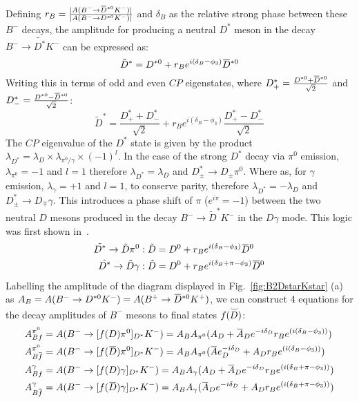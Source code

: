 \documentclass[oneside,12pt]{article}
\newcommand{\overbar}[1]{\mkern 1.5mu\overline{\mkern-1.5mu#1\mkern-1.5mu}\mkern
1.5mu}
\newcommand\brobor{\smash[b]{\raisebox{0.6\height}{\scalebox{0.5}{\tiny(}}{\mkern-1.5mu\scriptstyle-\mkern-1.5mu}\raisebox{0.6\height}{\scalebox{0.5}{\tiny)}}}}
\begin{document}
\noindent Defining $r_B=\frac{|A(B^{-}\rightarrow
\overbar{D}^{*0}K^-)|}{|A(B^{-}\rightarrow {D}^{*0}K^-)|}$ and $\delta_{B}$ as 
the relative strong phase between these $B^-$ decays, the amplitude for
producing a neutral ${D}^*$ meson in the decay $B^-\rightarrow \tilde{D^*}K^-$
can be expressed as:
  \begin{equation}
    \tilde{D}^*=D^{*0}+r_Be^{i(\delta_B-\phi_3)}\overbar{D}^{*0}
    \label{eq:DstTilde}
  \end{equation}
\noindent Writing this in terms of odd and even $CP$ eigenstates, where
$D^{*}_{+}=\frac{D^{*0}+\overbar{D}^{*0}}{\sqrt{2}}$ and
$D^{*}_{-}=\frac{D^{*0}-\overbar{D}^{*0}}{\sqrt{2}}$:
  \begin{equation}
    \tilde{D}^*=\frac{D^{*}_{+}+D^{*}_{-}}{\sqrt{2}}+r_Be^{i(\delta_B-\phi_3)}\frac{D^{*}_{+}-D^{*}_{-}}{\sqrt{2}}
    \label{eq:DstTildeCP}
  \end{equation}
\noindent The $CP$ eigenvalue of the $D^*$ state is given by the product
$\lambda_{D^*}=\lambda_D\times \lambda_{\pi^0\text{/}\gamma} \times(-1)^l$. In
the case of the strong $D^*$ decay via $\pi^0$ emission, $\lambda_{\pi^0}=-1$
and $l=1$ therefore $\lambda_{D^*}=\lambda_D$ and $D^*_{\pm}\rightarrow
D_{\pm}\pi^0$. Where as, for $\gamma$ emission, $\lambda_{\gamma}=+1$ and
$l=1$, to conserve parity, therefore $\lambda_{D^*}=-\lambda_D$ and
$D^*_{\pm}\rightarrow D_{\mp}\gamma$.  This introduces a phase shift of $\pi$
($e^{i\pi}=-1$) between the two neutral $D$ mesons produced in the decay
$B^-\rightarrow \tilde{D}^*K^-$ in the $D\gamma$ mode. This logic was first
shown in~\cite{ADSDstar}.
  \begin{align}
		\tilde{D^*}\rightarrow \tilde{D}\pi^0 &:
\tilde{D}=D^0+r_Be^{i(\delta_B-\phi_3)}\overbar{D}^0 \\
		\tilde{D^*}\rightarrow \tilde{D}\gamma &:
\tilde{D}=D^0+r_Be^{i(\delta_B+\pi-\phi_3)}\overbar{D}^0
  \end{align}
Labelling the amplitude of the diagram displayed in Fig.~\ref{fig:B2DstarKstar}
(a) as $A_{B}=A(B^{-}\rightarrow D^{*0}K^{-})=A(B^{+}\rightarrow
\overbar{D}^{*0}K^{+})$, we can construct 4 equations for the decay amplitudes
of $B^{-}$ mesons to final states $f(\accentset{\brobor}{D}\phantom{})$:
\begin{align}
    A_{Bf}^{\pi^{0}}&=A(B^{-}\rightarrow
    [f(D)\pi^{0}]_{D^{*}}K^{-})=A_{B}A_{\pi^{0}}(A_{D}+\overbar{A}_{D}e^{-i\delta_D}r_{B}e^{(i(\delta_{B}-\phi_{3}))})
    \\
		A_{B\overbar{f}}^{\pi^{0}}&=A(B^{-}\rightarrow
[f(\overbar{D})\pi^{0}]_{D^{*}}K^{-})=A_{B}A_{\pi^{0}}(\overbar{A}e^{-i\delta_D}_{D}+A_{D}r_{B}e^{(i(\delta_{B}-\phi_{3}))})
\\
    A_{Bf}^{\gamma}&=A(B^{-}\rightarrow
    [f(D)\gamma]_{D^{*}}K^{-})=A_{B}A_{\gamma}(A_{D}+\overbar{A}_{D}e^{-i\delta_D}r_{B}e^{(i(\delta_{B}+\pi-\phi_{3}))})
    \\
		A_{B\overbar{f}}^{\gamma}&=A(B^{-}\rightarrow
[f(\overbar{D})\gamma]_{D^{*}}K^{-})=A_{B}A_{\gamma}(\overbar{A}_{D}e^{-i\delta_D}+A_{D}r_{B}e^{(i(\delta_{B}+\pi-\phi_{3}))})
  \end{align}
\end{document}

